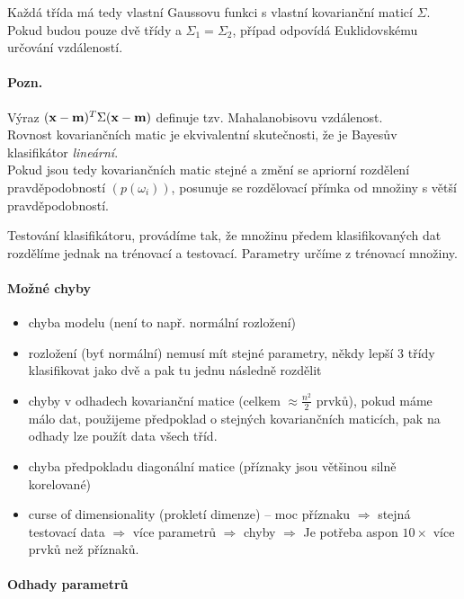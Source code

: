 Každá třída má tedy vlastní Gaussovu funkci s vlastní kovarianční maticí $\Sigma$.
Pokud budou pouze dvě třídy a $\Sigma_1=\Sigma_2$, případ odpovídá Euklidovskému určování vzdáleností.

\paragraph{Pozn.} Výraz $(\mathbf{x}-\mathbf{m})^T\Sigma(\mathbf{x}-\mathbf{m})$ definuje tzv. Mahalanobisovu vzdálenost.\\
Rovnost kovariančních matic je ekvivalentní skutečnosti, že je Bayesův klasifikátor {\em lineární}.\\
Pokud jsou tedy kovariančních matic stejné a změní se apriorní rozdělení 
pravděpodobností $(p(\omega_i))$, posunuje se rozdělovací přímka od množiny s větší pravděpodobností.


Testování klasifikátoru, provádíme tak, že množinu předem klasifikovaných dat rozdělíme jednak na trénovací a
testovací. Parametry určíme z trénovací množiny.

\paragraph{Možné chyby}
\begin{itemize}
\item chyba modelu (není to např. normální rozložení)
\item rozložení (byť normální) nemusí mít stejné parametry, někdy lepší 3 třídy klasifikovat jako dvě a pak tu
jednu následně rozdělit
\item chyby v odhadech kovarianční matice (celkem $\approx\frac{n^2}{2}$ prvků), pokud máme málo dat, 
použijeme předpoklad o stejných kovariančních maticích, pak na odhady lze použít data všech tříd.
\item chyba předpokladu diagonální matice (příznaky jsou většinou silně korelované)
\item curse of dimensionality (prokletí dimenze) -- moc příznaku $\Rightarrow$ stejná testovací data $\Rightarrow$ 
více parametrů $\Rightarrow$ chyby $\Rightarrow$ Je potřeba aspon $10\times$ více prvků než příznaků.
\end{itemize}

\paragraph{Odhady parametrů}

